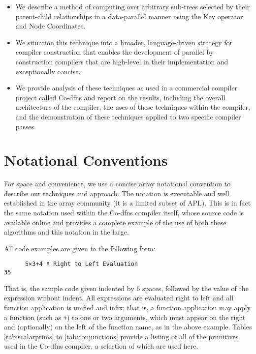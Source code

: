 \documentclass[numbers,preprint]{sigplanconf}
\begin{document}
\begin{itemize}[noitemsep]

\item We describe a method of computing over arbitrary sub-trees
selected by their parent-child relationships in a data-parallel manner
using the Key operator and Node Coordinates.

\item We situation this technique into a broader, language-driven 
strategy for compiler construction that enables the development of parallel 
by construction compilers that are high-level in their implementation and 
exceptionally concise.

\item We provide analysis of these techniques as used in a commercial
compiler project called Co-dfns and report on the results,
including the overall architecture of the compiler, the uses of these 
techniques within the compiler, and the demonstration of these techniques 
applied to two specific compiler passes.

\end{itemize}

\section{Notational Conventions}

For space and convenience, we use a concise array notational convention to 
describe our techniques and approach. The notation is executable and well 
established in the array community (it is a limited subset of APL). This is 
in fact the same notation used within the Co-dfns compiler itself, whose 
source code is available online and provides a complete example of the use 
of both these algorithms and this notation in the large. 

All code examples are given in the following form:

\begin{verbatim}
      5×3+4 ⍝ Right to Left Evaluation
35
\end{verbatim}

That is, the sample code given indented by 6 spaces, followed by the value 
of the expression without indent. All expressions are evaluated right to 
left and all function application is unified and infix; that is, a function 
application may apply a function (such as \verb;+;) to one or two arguments, 
which must appear on the right and (optionally) on the left of the function 
name, as in the above example. Tables \ref{tab:scalarprims} to 
\ref{tab:conjunctions}
provide a listing of all of the primitives used in the Co-dfns compiler, 
a selection of which are used here. 
\end{document}
